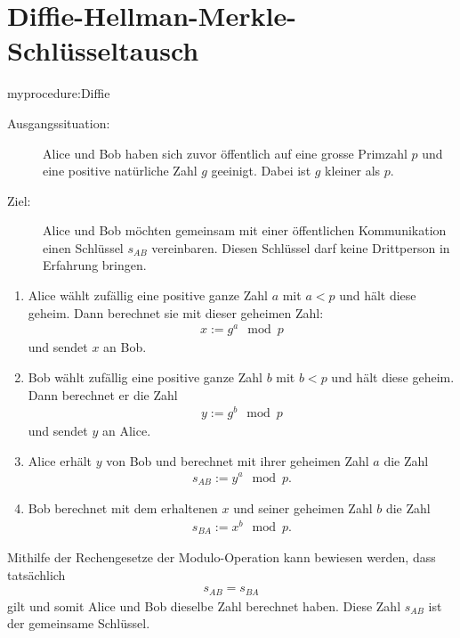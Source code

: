 \section{Diffie-Hellman-Merkle-Schlüsseltausch}
\begin{myprocedure}{myprocedure:Diffie}
	\begin{description}
		\item[Ausgangssituation:] Alice und Bob haben sich zuvor öffentlich auf eine grosse Primzahl $p$ und eine positive natürliche Zahl $g$ geeinigt. Dabei ist $g$ kleiner als $p$.
		\item[Ziel:] Alice und Bob möchten gemeinsam mit einer öffentlichen Kommunikation einen Schlüssel $s_{AB}$ vereinbaren. Diesen Schlüssel darf keine Drittperson in Erfahrung bringen.
	\end{description}
	\begin{enumerate}
		\item Alice wählt zufällig eine positive ganze Zahl $a$ mit $a<p$ und hält diese geheim. Dann berechnet sie mit dieser geheimen Zahl:
		      \begin{align*}
			      x := g^a\mod p
		      \end{align*}
		      und sendet $x$ an Bob.
		\item Bob wählt zufällig eine positive ganze Zahl $b$ mit $b<p$ und hält diese geheim. Dann berechnet er die Zahl
		      \begin{align*}
			      y := g^b\mod p
		      \end{align*}
		      und sendet $y$ an Alice.
		\item Alice erhält $y$ von Bob und berechnet mit ihrer geheimen Zahl $a$ die Zahl
		      \begin{align*}
			      s_{AB} := y^a\mod p.
		      \end{align*}
		\item Bob berechnet mit dem erhaltenen $x$ und seiner geheimen Zahl $b$ die Zahl
		      \begin{align*}
			      s_{BA} := x^b\mod p.
		      \end{align*}
	\end{enumerate}
	Mithilfe der Rechengesetze der Modulo-Operation kann bewiesen werden, dass tatsächlich
	\begin{align*}
		s_{AB} = s_{BA}
	\end{align*}
	gilt und somit Alice und Bob dieselbe Zahl berechnet haben. Diese Zahl $s_{AB}$ ist der gemeinsame Schlüssel.
\end{myprocedure}


